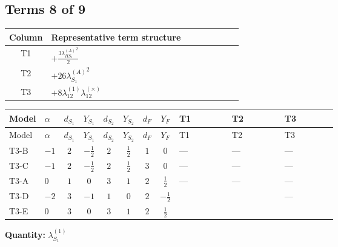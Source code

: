 \documentclass[8pt]{article}
\begin{document}
\begin{landscape}
\subsection*{Terms 8 of 9}
\begin{center}
\begin{tabular}{@{}c >{\raggedright\arraybackslash}p{0.82\linewidth}@{}}
\toprule
Column & Representative term structure \\
\midrule
T1 & \(\displaystyle +\frac{3 {\lambda_{HS_1}^{(A)}}^2}{2}\) \\
\midrule
T2 & \(\displaystyle +26 {\lambda_{S_1}^{(A)}}^2\) \\
\midrule
T3 & \(\displaystyle +8 {\lambda_{12}^{(1)}} {\lambda_{12}^{(\times)}}\) \\
\midrule
\bottomrule
\end{tabular}
\end{center}
\smallskip
\tiny
\begin{longtable}{@{}llcccccc >{\raggedright\arraybackslash}p{0.21\linewidth} >{\raggedright\arraybackslash}p{0.21\linewidth} >{\raggedright\arraybackslash}p{0.21\linewidth}@{}}
\toprule
Model & $\alpha$ & $d_{S_1}$ & $Y_{S_1}$ & $d_{S_2}$ & $Y_{S_2}$ & $d_F$ & $Y_F$ & T1 & T2 & T3 \\
\midrule
\endfirsthead
\toprule
Model & $\alpha$ & $d_{S_1}$ & $Y_{S_1}$ & $d_{S_2}$ & $Y_{S_2}$ & $d_F$ & $Y_F$ & T1 & T2 & T3 \\
\midrule
\endhead
T3-B & $-1$ & $2$ & $-\frac{1}{2}$ & $2$ & $\frac{1}{2}$ & $1$ & $0$ & --- & --- & --- \\
\midrule
T3-C & $-1$ & $2$ & $-\frac{1}{2}$ & $2$ & $\frac{1}{2}$ & $3$ & $0$ & --- & --- & --- \\
\midrule
T3-A & $0$ & $1$ & $0$ & $3$ & $1$ & $2$ & $\frac{1}{2}$ & --- & --- & --- \\
\midrule
T3-D & $-2$ & $3$ & $-1$ & $1$ & $0$ & $2$ & $-\frac{1}{2}$ & \scriptsize\adjustbox{max width=\linewidth}{$\begin{gathered} +\frac{3 {\lambda_{HS_1}^{(A)}}^2}{2}\end{gathered}$} & \scriptsize\adjustbox{max width=\linewidth}{$\begin{gathered} +26 {\lambda_{S_1}^{(A)}}^2\end{gathered}$} & --- \\
\midrule
T3-E & $0$ & $3$ & $0$ & $3$ & $1$ & $2$ & $\frac{1}{2}$ & \scriptsize\adjustbox{max width=\linewidth}{$\begin{gathered} +\frac{3 {\lambda_{HS_1}^{(A)}}^2}{2}\end{gathered}$} & \scriptsize\adjustbox{max width=\linewidth}{$\begin{gathered} +26 {\lambda_{S_1}^{(A)}}^2\end{gathered}$} & \scriptsize\adjustbox{max width=\linewidth}{$\begin{gathered} +8 {\lambda_{12}^{(1)}} {\lambda_{12}^{(\times)}}\end{gathered}$} \\
\midrule
\bottomrule
\end{longtable}
\clearpage
\noindent\textbf{Quantity: }$\lambda_{S_1}^{(1)}$\par\smallskip

\end{landscape}
\end{document}
